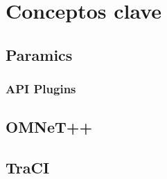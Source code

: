 \chapter{Conceptos clave}

\section{Paramics}
\subsection{API Plugins}\label{sec:paramics_api}
\section{OMNeT++}
\section{TraCI}\label{sec:traci}


